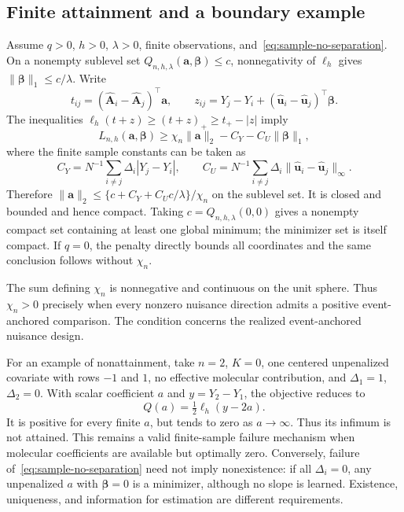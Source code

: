 \subsection{Finite attainment and a boundary example}
\label{subapp:existence}
Assume $q>0$, $h>0$, $\lambda>0$, finite observations, and~\eqref{eq:sample-no-separation}. On a nonempty sublevel set $Q_{n,h,\lambda}(\bm{a},\bm{\beta})\le c$, nonnegativity of $\ell_h$ gives $\|\bm{\beta}\|_1\le c/\lambda$. Write
\[
 t_{ij}=(\widehat{\bm{A}}_i-\widehat{\bm{A}}_j)^\top \bm{a},\qquad
 z_{ij}=Y_j-Y_i+(\widehat{\bm{u}}_i-\widehat{\bm{u}}_j)^\top\bm{\beta}.
\]
The inequalities $\ell_h(t+z)\ge(t+z)_+\ge t_+-|z|$ imply
\[
 L_{n,h}(\bm{a},\bm{\beta})
 \ge \chi_n\|\bm{a}\|_2-C_Y-C_U\|\bm{\beta}\|_1,
\]
where the finite sample constants can be taken as
\[
 C_Y=N^{-1}\sum_{i\ne j}\Delta_i|Y_j-Y_i|,
 \qquad
 C_U=N^{-1}\sum_{i\ne j}\Delta_i\|\widehat{\bm{u}}_i-\widehat{\bm{u}}_j\|_\infty.
\]
Therefore $\|\bm{a}\|_2\le\{c+C_Y+C_Uc/\lambda\}/\chi_n$ on the sublevel set. It is closed and bounded and hence compact. Taking $c=Q_{n,h,\lambda}(0,0)$ gives a nonempty compact set containing at least one global minimum; the minimizer set is itself compact. If $q=0$, the penalty directly bounds all coordinates and the same conclusion follows without $\chi_n$.

The sum defining $\chi_n$ is nonnegative and continuous on the unit sphere. Thus $\chi_n>0$ precisely when every nonzero nuisance direction admits a positive event-anchored comparison. The condition concerns the realized event-anchored nuisance design.

For an example of nonattainment, take $n=2$, $K=0$, one centered unpenalized covariate with rows $-1$ and $1$, no effective molecular contribution, and $\Delta_1=1$, $\Delta_2=0$. With scalar coefficient $a$ and $y=Y_2-Y_1$, the objective reduces to
\[
 Q(a)=\tfrac12\ell_h(y-2a).
\]
It is positive for every finite $a$, but tends to zero as $a\to\infty$. Thus its infimum is not attained. This remains a valid finite-sample failure mechanism when molecular coefficients are available but optimally zero. Conversely, failure of~\eqref{eq:sample-no-separation} need not imply nonexistence: if all $\Delta_i=0$, any unpenalized $a$ with $\bm{\beta}=0$ is a minimizer, although no slope is learned. Existence, uniqueness, and information for estimation are different requirements.
